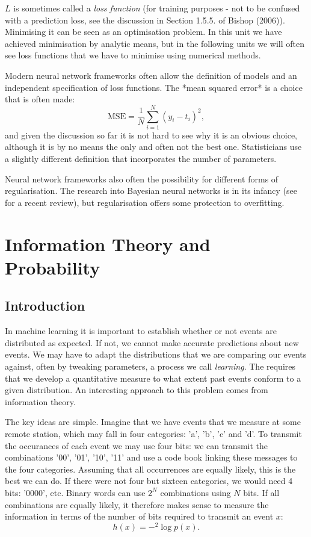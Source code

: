 $L$ is sometimes called a \emph{loss function} (for training purposes - not to be confused with a prediction loss, see the discussion in Section 1.5.5. of Bishop (2006)). Minimising it can be seen as an optimisation problem. In this unit we have achieved minimisation by analytic means, but in the following units we will often see loss functions that we have to minimise using numerical methods.

Modern neural network frameworks often allow the definition of models and an independent specification of loss
functions. The *mean squared error* is a choice that is often made:
$$
\mbox{MSE} = \frac{1}{N}\sum^N_{i=1}(y_i - t_i)^2,
$$
and given the discussion so far it is not hard to see why it is an obvious choice, although it is by no means the only  and often not the best one. Statisticians use a slightly different definition that incorporates the number of parameters.

Neural network frameworks also often the possibility for different forms of regularisation. The research into Bayesian neural networks is in its infancy (see \cite{jospin2020} for a recent review), but regularisation offers some protection to overfitting.


\chapter{Information Theory and Probability}
\section{Introduction}
In machine learning it is important to establish whether or not events are distributed as expected. If not, we cannot make accurate predictions about new events. We may have to
adapt the distributions that we are comparing our events against, often by tweaking parameters, a process we call \emph{learning}. The requires that we develop a quantitative
measure to what extent past events conform to a given distribution. An interesting approach to this problem comes from information theory.

The key ideas are simple. Imagine that we have events that we measure at some remote station, which may fall in four categories: 'a', 'b', 'c' and 'd'. To transmit the occurances
of each event we may use four bits: we can transmit the combinations '00', '01', '10', '11' and use a code book linking these messages to the four categories. Assuming that
all occurrences are equally likely, this is the best we can do. If there were not four but sixteen categories, we would need 4 bits: '0000', etc. Binary words can use
$2^N$ combinations using $N$ bits. If all combinations are equally likely, it therefore makes sense to measure the information in terms of the number of bits required
to transmit an event $x$:
$$
h(x) = -^2\log p(x).
$$

